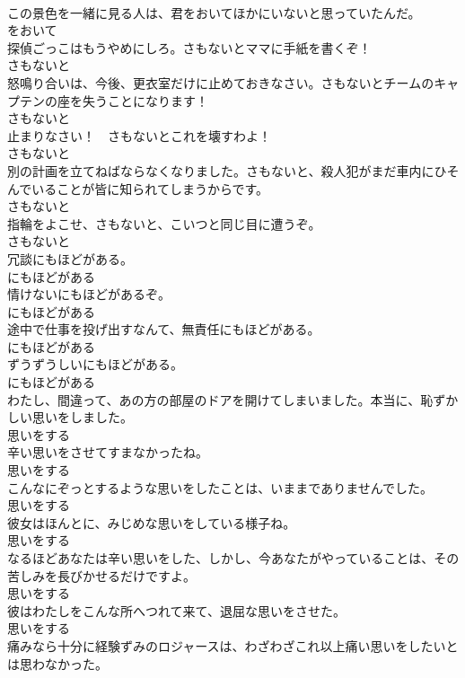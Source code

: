 \documentclass[8pt]{extreport}
\begin{document}
\begin{CJK}{UTF8}{min}
\\	この景色を一緒に見る人は、君をおいてほかにいないと思っていたんだ。	
\\	をおいて	
\\	探偵ごっこはもうやめにしろ。さもないとママに手紙を書くぞ！	
\\	さもないと	
\\	怒鳴り合いは、今後、更衣室だけに止めておきなさい。さもないとチームのキャプテンの座を失うことになります！	
\\	さもないと	
\\	止まりなさい！　さもないとこれを壊すわよ！	
\\	さもないと	
\\	別の計画を立てねばならなくなりました。さもないと、殺人犯がまだ車内にひそんでいることが皆に知られてしまうからです。	
\\	さもないと	
\\	指輪をよこせ、さもないと、こいつと同じ目に遭うぞ。	
\\	さもないと	
\\	冗談にもほどがある。	
\\	にもほどがある	
\\	情けないにもほどがあるぞ。	
\\	にもほどがある	
\\	途中で仕事を投げ出すなんて、無責任にもほどがある。	
\\	にもほどがある	
\\	ずうずうしいにもほどがある。	
\\	にもほどがある	
\\	わたし、間違って、あの方の部屋のドアを開けてしまいました。本当に、恥ずかしい思いをしました。	
\\	思いをする	
\\	辛い思いをさせてすまなかったね。	
\\	思いをする	
\\	こんなにぞっとするような思いをしたことは、いままでありませんでした。	
\\	思いをする	
\\	彼女はほんとに、みじめな思いをしている様子ね。	
\\	思いをする	
\\	なるほどあなたは辛い思いをした、しかし、今あなたがやっていることは、その苦しみを長びかせるだけですよ。	
\\	思いをする	
\\	彼はわたしをこんな所へつれて来て、退屈な思いをさせた。	
\\	思いをする	
\\	痛みなら十分に経験ずみのロジャースは、わざわざこれ以上痛い思いをしたいとは思わなかった。	

\end{CJK}
\end{document}
